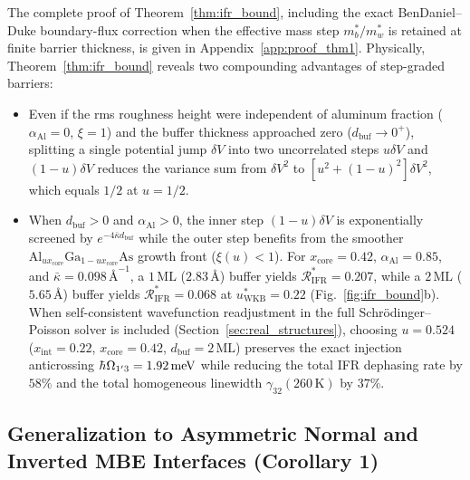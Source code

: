 \documentclass[11pt,letterpaper]{article}
\renewcommand{\hbar}{\mathchar'26\mkern-9mu h}
\begin{document}
The complete proof of Theorem~\ref{thm:ifr_bound}, including the exact BenDaniel--Duke boundary-flux correction when the effective mass step $m_b^*/m_w^*$ is retained at finite barrier thickness, is given in Appendix~\ref{app:proof_thm1}. Physically, Theorem~\ref{thm:ifr_bound} reveals two compounding advantages of step-graded barriers:
\begin{itemize}
    \item Even if the rms roughness height were independent of aluminum fraction ($\alpha_{\mathrm{Al}} = 0$, $\xi = 1$) and the buffer thickness approached zero ($d_{\mathrm{buf}} \to 0^+$), splitting a single potential jump $\delta V$ into two uncorrelated steps $u\delta V$ and $(1-u)\delta V$ reduces the variance sum from $\delta V^2$ to $[u^2 + (1-u)^2]\delta V^2$, which equals $1/2$ at $u = 1/2$.
    \item When $d_{\mathrm{buf}} > 0$ and $\alpha_{\mathrm{Al}} > 0$, the inner step $(1-u)\delta V$ is exponentially screened by $e^{-4\bar{\kappa} d_{\mathrm{buf}}}$ while the outer step benefits from the smoother $\mathrm{Al}_{u x_{\mathrm{core}}}\mathrm{Ga}_{1-u x_{\mathrm{core}}}\mathrm{As}$ growth front ($\xi(u) < 1$). For $x_{\mathrm{core}} = 0.42$, $\alpha_{\mathrm{Al}} = 0.85$, and $\bar{\kappa} = 0.098\,\text{\AA}^{-1}$, a $1\,\mathrm{ML}$ ($2.83$\,\AA) buffer yields $\mathcal{R}_{\mathrm{IFR}}^* = 0.207$, while a $2\,\mathrm{ML}$ ($5.65$\,\AA) buffer yields $\mathcal{R}_{\mathrm{IFR}}^* = 0.068$ at $u_{\mathrm{WKB}}^* = 0.22$ (Fig.~\ref{fig:ifr_bound}b). When self-consistent wavefunction readjustment in the full Schr\"odinger--Poisson solver is included (Section~\ref{sec:real_structures}), choosing $u = 0.524$ ($x_{\mathrm{int}} = 0.22$, $x_{\mathrm{core}} = 0.42$, $d_{\mathrm{buf}} = 2\,\mathrm{ML}$) preserves the exact injection anticrossing $\hbar\Omega_{1'3} = 1.92\,\mathrm{meV}$ while reducing the total IFR dephasing rate by $58\%$ and the total homogeneous linewidth $\gamma_{32}(260\,\mathrm{K})$ by $37\%$.
\end{itemize}

\subsection{Generalization to Asymmetric Normal and Inverted MBE Interfaces (Corollary 1)}
\label{subsec:asymmetric_mbe}
\end{document}
